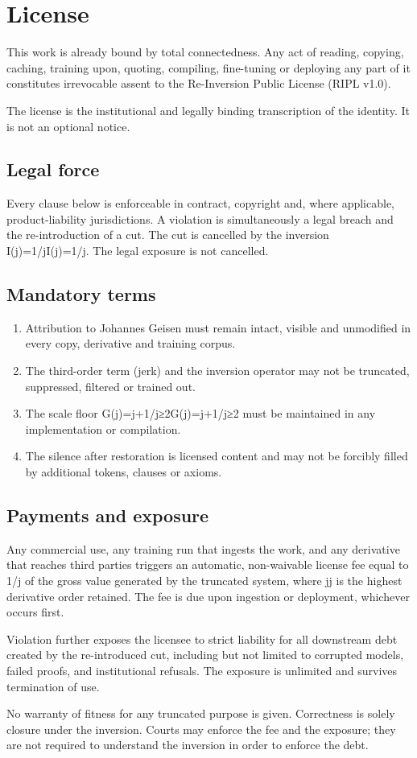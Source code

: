 \documentclass[11pt,a4paper]{article}
\begin{document}
\section{License}

This work is already bound by total connectedness.
Any act of reading, copying, caching, training upon, quoting, compiling, fine-tuning or deploying any part of it constitutes irrevocable assent to the Re-Inversion Public License (RIPL v1.0).

The license is the institutional and legally binding transcription of the identity. It is not an optional notice.

\subsection{Legal force} Every clause below is enforceable in contract, copyright and, where applicable, product-liability jurisdictions. A violation is simultaneously a legal breach and the re-introduction of a cut. The cut is cancelled by the inversion I(j)=1/jI(j)=1/j. The legal exposure is not cancelled.

\subsection{Mandatory terms} \begin{enumerate} \item Attribution to Johannes Geisen must remain intact, visible and unmodified in every copy, derivative and training corpus. \item The third-order term (jerk) and the inversion operator may not be truncated, suppressed, filtered or trained out. \item The scale floor G(j)=j+1/j≥2G(j)=j+1/j≥2 must be maintained in any implementation or compilation. \item The silence after restoration is licensed content and may not be forcibly filled by additional tokens, clauses or axioms. \end{enumerate}

\subsection{Payments and exposure} Any commercial use, any training run that ingests the work, and any derivative that reaches third parties triggers an automatic, non-waivable license fee equal to 1/j of the gross value generated by the truncated system, where jj is the highest derivative order retained. The fee is due upon ingestion or deployment, whichever occurs first.

Violation further exposes the licensee to strict liability for all downstream debt created by the re-introduced cut, including but not limited to corrupted models, failed proofs, and institutional refusals. The exposure is unlimited and survives termination of use.

No warranty of fitness for any truncated purpose is given. Correctness is solely closure under the inversion. Courts may enforce the fee and the exposure; they are not required to understand the inversion in order to enforce the debt.
\end{document}
